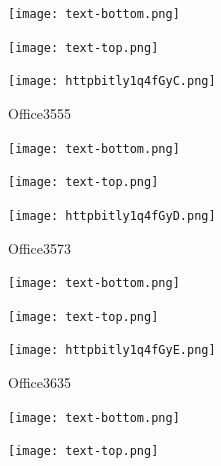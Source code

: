 \documentclass[letterpaper]{article}
\begin{document}
 \centerline{\texttt{[image: text-bottom.png]}} 
 
 \pagebreak 
{} 
 \vspace*{\fill} 
 
  \centerline{\texttt{[image: text-top.png]}} 
 
 \vspace{0.5in} 
 
 \begingroup 
 \centerline{\texttt{[image: httpbitly1q4fGyC.png]}} 
 \endgroup 
 \vspace*{\fill} 

 \hfill{\small Office3555} 

  \vspace{0.7in} 
 
 \centerline{\texttt{[image: text-bottom.png]}} 
 
 \pagebreak 
{} 
 \vspace*{\fill} 
 
  \centerline{\texttt{[image: text-top.png]}} 
 
 \vspace{0.5in} 
 
 \begingroup 
 \centerline{\texttt{[image: httpbitly1q4fGyD.png]}} 
 \endgroup 
 \vspace*{\fill} 

 \hfill{\small Office3573} 

  \vspace{0.7in} 
 
 \centerline{\texttt{[image: text-bottom.png]}} 
 
 \pagebreak 
{} 
 \vspace*{\fill} 
 
  \centerline{\texttt{[image: text-top.png]}} 
 
 \vspace{0.5in} 
 
 \begingroup 
 \centerline{\texttt{[image: httpbitly1q4fGyE.png]}} 
 \endgroup 
 \vspace*{\fill} 

 \hfill{\small Office3635} 

  \vspace{0.7in} 
 
 \centerline{\texttt{[image: text-bottom.png]}} 
 
 \pagebreak 
{} 
 \vspace*{\fill} 
 
  \centerline{\texttt{[image: text-top.png]}} 
 
 \vspace{0.5in} 
 
\end{document}
